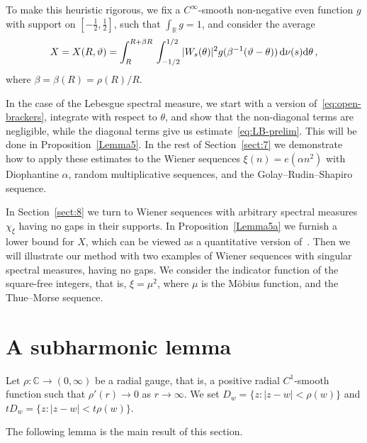\documentclass[11pt]{amsart}
\numberwithin{equation}{section}
\newcommand{\bR}{\mathbb R}
\newcommand{\bC}{\mathbb C}
\begin{document}
\medskip
To make this heuristic rigorous, we fix a $C^\infty$-smooth non-negative even function $g$
with support on $[-\tfrac12, \tfrac12]$, such that $\displaystyle \int_\bR g = 1$,
and consider the average
\[
X = X(R, \vartheta)
= \int_{R}^{R+\beta R}\, \int_{-1/2}^{1/2}
|W_s(\theta)|^2 g(\beta^{-1}(\vartheta-\theta))\, {\rm d}\nu (s) {\rm d}\theta\,,
\]
where $\beta = \beta(R) = \rho(R)/R$.

In the case of the Lebesgue spectral measure, we
start with a version of~\eqref{eq:open-brackers}, integrate with respect to $\theta$,
and show that the non-diagonal terms are negligible,
while the diagonal terms give us estimate~\eqref{eq:LB-prelim}. This will be done in Proposition~\ref{Lemma5}.
In the rest of Section~\ref{sect:7} we demonstrate
how to apply these estimates to the Wiener sequences $\xi (n) = e(\alpha n^2)$ with Diophantine
$\alpha$, random multiplicative sequences, and the Golay--Rudin--Shapiro sequence.

\medskip 
In Section~\ref{sect:8} we turn to Wiener sequences with arbitrary spectral measures $\chi_\xi$
having no gaps in their supports. In Proposition~\ref{Lemma5a} we furnish
a lower bound for $X$, which can be viewed
as a quantitative version of~\cite[Lemma~5]{BBS}. Then we will illustrate our method with two examples
of Wiener sequences with singular spectral measures, having no gaps. We consider the indicator function
of the square-free integers,  that is, $\xi=\mu^2$, where $\mu$ is the M\"obius function, and
the Thue--Morse sequence.


\section{A subharmonic lemma}\label{sect:2}
Let $\rho\colon \bC \to (0, \infty)$ be a radial gauge, that is,
a positive radial $C^1$-smooth function such that 
$\rho'(r)\to 0$ as $r\to\infty$.
We set $D_w = \{z\colon |z-w|<\rho(w)\}$
and $tD_w = \{z\colon |z-w|<t\rho(w)\}$.

The following lemma is the main result of this section.
\end{document}
